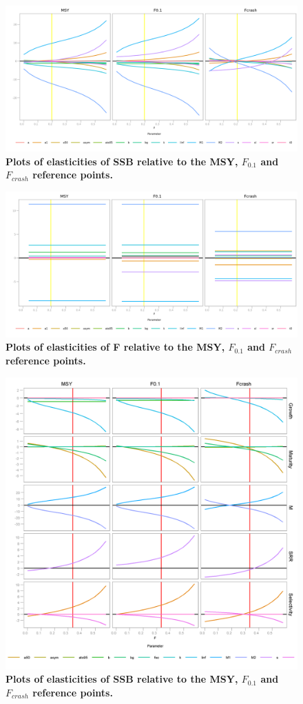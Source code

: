 \documentclass{pnastwo}
\begin{document}
\begin{figure}[ht]
\begin{center}
\centerline{\includegraphics[width=.7\textwidth]{fig4a.png}}
\end{center}
\caption{\bf{Plots of elasticities of SSB relative to the MSY, $F_{0.1}$ and $F_{crash}$ reference points.}}
\label{fig:elasssbAll}
\end{figure}


\begin{figure}[ht]
\begin{center}
\centerline{\includegraphics[width=.7\textwidth]{fig5a.png}}
\end{center}
\caption{\bf{Plots of elasticities of F relative to the MSY, $F_{0.1}$ and $F_{crash}$ reference points.}}
\label{fig:elasfAll}
\end{figure}


\begin{figure}[ht]
\begin{center}
\centerline{\includegraphics[width=.7\textwidth]{fig4.png}}
\end{center}
\caption{\bf{Plots of elasticities of SSB relative to the MSY, $F_{0.1}$ and $F_{crash}$ reference points.}}
\label{fig:elasssb}
\end{figure}
\end{document}

